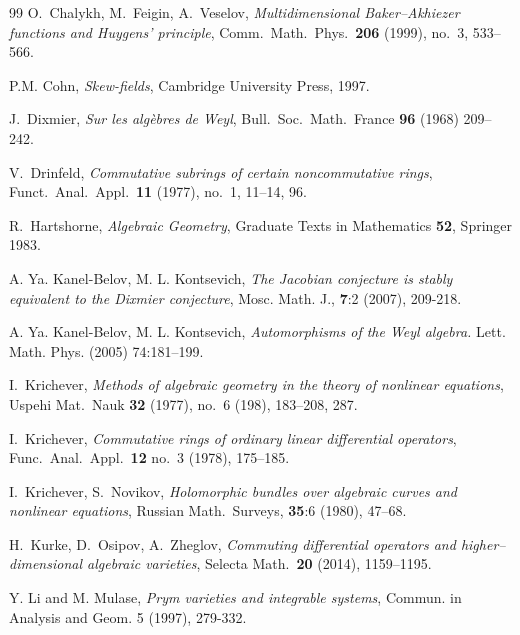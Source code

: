 \documentclass[11pt]{article}
\theoremstyle{definition}
\theoremstyle{plain}
\numberwithin{equation}{section}
\begin{document}
\begin{thebibliography}{99}
O.~Chalykh, M.~Feigin, A.~Veselov, \emph{Multidimensional Baker--Akhiezer functions and Huygens' principle},  Comm.~Math.~Phys.~\textbf{206} (1999),
no.~{3}, 533--566.

 
 P.M. Cohn, {\em Skew-fields}, Cambridge University Press, 1997.


 J.~Dixmier, \textit{Sur les alg\`ebres de Weyl},  Bull.~Soc.~Math.~France \textbf{96} (1968) 209--242.

 V.~Drinfeld, \emph{Commutative subrings of certain noncommutative rings}, Funct.~Anal.~Appl.~\textbf{11} (1977), no.~1, 11--14, 96.


 R.~Hartshorne,  \emph{Algebraic Geometry}, Graduate Texts in Mathematics
  \textbf{52}, Springer  1983.
  

 A. Ya. Kanel-Belov, M. L. Kontsevich,
{\it The Jacobian conjecture is stably equivalent to the Dixmier conjecture},
Mosc. Math. J., {\bf 7}:2 (2007),  209-218.

 A. Ya. Kanel-Belov, M. L. Kontsevich,  {\it Automorphisms of the Weyl algebra.} Lett. Math. Phys. (2005) 74:181–199.

 I.~Krichever, \textit{Methods of algebraic geometry in the theory of nonlinear equations}, Uspehi Mat.~Nauk \textbf{32} (1977), no.~6 (198), 183--208, 287.

 I.~Krichever, \textit{Commutative rings of ordinary linear differential operators}, Func.~Anal.~Appl.~\textbf{12} no.~3 (1978), 175--185.

 I.~Krichever, S.~Novikov, \textit{Holomorphic bundles over algebraic curves and nonlinear equations}, Russian Math.~Surveys, {\bf 35}:6 (1980), 47--68.


 H.~Kurke, D.~Osipov, A.~Zheglov, \textit{Commuting differential operators and higher--dimensional algebraic varieties}, Selecta Math.~{\bf 20} (2014),  1159--1195.

 Y. Li and M. Mulase, {\it Prym varieties and integrable systems}, Commun. in Analysis and Geom. 5 (1997), 279-332. 





\end{thebibliography}
\end{document}
